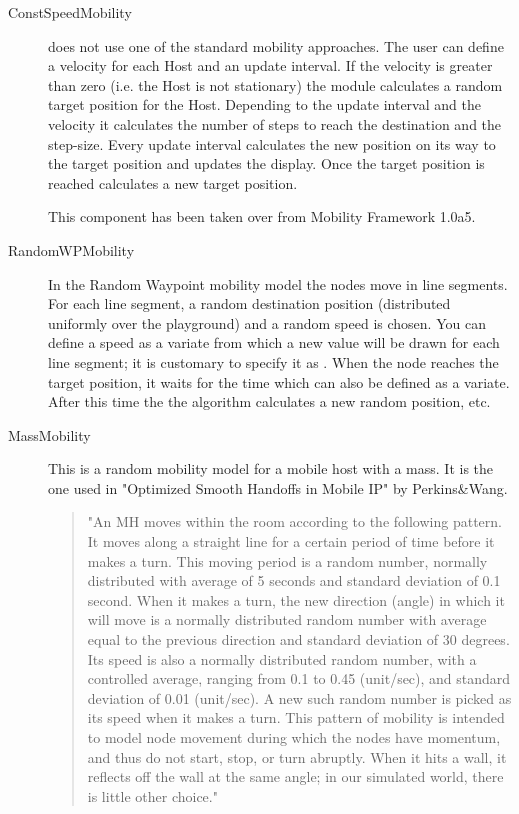 \begin{description}
\item[ConstSpeedMobility]

 does not use one of the standard mobility
approaches. The user can define a velocity for each Host and an update interval. If
the velocity is greater than zero (i.e. the Host is not stationary) the
 module calculates a random target position for the
Host. Depending to the update interval and the velocity it calculates the number of
steps to reach the destination and the step-size. Every update interval
 calculates the new position on its way to the
target position and updates the display. Once the target position is reached
 calculates a new target position.

This component has been taken over from Mobility Framework 1.0a5.


\item[RandomWPMobility]

In the Random Waypoint mobility model the nodes move in line segments. For each
line segment, a random destination position (distributed uniformly over the
playground) and a random speed is chosen. You can define a speed as a variate
from which a new value will be drawn for each line segment; it is customary to
specify it as . When the node reaches the
target position, it waits for the time  which can also be defined as a
variate. After this time the the algorithm calculates a new random position, etc.

\item[MassMobility] 

This is a random mobility model for a mobile host with
a mass. It is the one used in "Optimized Smooth Handoffs in Mobile IP" by
Perkins\&Wang.

\begin{quote}
"An MH moves within the room according to the following pattern. It moves
along a straight line for a certain period of time before it makes a turn.
This moving period is a random number, normally distributed with average of
5 seconds and standard deviation of 0.1 second. When it makes a turn, the
new direction (angle) in which it will move is a normally distributed
random number with average equal to the previous direction and standard
deviation of 30 degrees. Its speed is also a normally distributed random
number, with a controlled average, ranging from 0.1 to 0.45 (unit/sec), and
standard deviation of 0.01 (unit/sec). A new such random number is picked
as its speed when it makes a turn. This pattern of mobility is intended to
model node movement during which the nodes have momentum, and thus do not
start, stop, or turn abruptly. When it hits a wall, it reflects off the
wall at the same angle; in our simulated world, there is little other
choice."
\end{quote}


\end{description}
